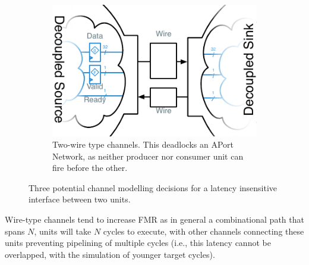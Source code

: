 \begin{figure}
\begin{subfigure}[t]{0.49\textwidth}
    \end{subfigure}
    \begin{subfigure}[t]{0.49\textwidth}
        \captionsetup{margin=0.25cm}
        \includegraphics[width=\columnwidth]{figures/li-wire-channel-manual.pdf}
        \caption{Two-wire type channels. This deadlocks an APort Network, as neither producer nor consumer unit can fire
        before the other.}
    \end{subfigure}
    \centering
    \vspace{-0.25in}
    \caption{Three potential channel modelling decisions for a latency insensitive interface between two units.}
    \label{fig:channel-deadlock}
\end{figure}

Wire-type channels tend to increase FMR as in general a
combinational path that spans $N$, units will take $N$ cycles to execute, with
other channels connecting these units preventing pipelining of multiple cycles
(i.e., this latency cannot be overlapped, with the simulation of younger target
cycles).

